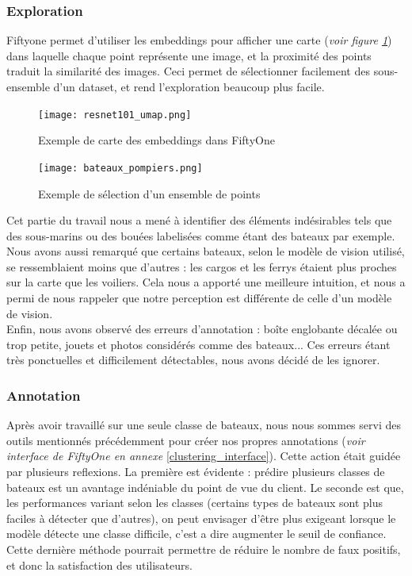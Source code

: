 \subsubsection{Exploration}

Fiftyone permet d'utiliser les embeddings pour afficher une carte (\textit{voir figure \ref{carte_similarite}})
    dans laquelle chaque point représente
une image, et la proximité des points traduit la similarité des images.
Ceci permet de sélectionner facilement des sous-ensemble d'un dataset, et rend l'exploration beaucoup
plus facile.

\begin{figure}[H]
    \centering
    \texttt{[image: resnet101\_umap.png]}
    \caption{Exemple de carte des embeddings dans FiftyOne}\label{carte_similarite}
\end{figure}

\begin{figure}[H]
    \centering
    \texttt{[image: bateaux\_pompiers.png]}
    \caption{Exemple de sélection d'un ensemble de points}
\end{figure}

Cet partie du travail nous a mené à identifier des éléments indésirables tels que des sous-marins ou
des bouées labelisées comme étant des bateaux par exemple. Nous avons aussi remarqué que certains bateaux,
selon le modèle de vision utilisé, se ressemblaient moins que d'autres : les cargos et les ferrys étaient
plus proches sur la carte que les voiliers. Cela nous a apporté une meilleure intuition, et nous a permi de nous rappeler que notre perception est différente de celle d'un modèle de vision.\\

Enfin, nous avons observé des erreurs d'annotation : boîte englobante décalée ou trop petite,
jouets et photos considérés comme des bateaux... Ces erreurs étant très ponctuelles et difficilement
détectables, nous avons décidé de les ignorer.\\

\subsubsection{Annotation}

Après avoir travaillé sur une seule classe de bateaux, nous nous sommes servi des outils mentionnés précédemment
pour créer nos propres annotations (\textit{voir interface de FiftyOne en annexe }\ref{clustering_interface}).
Cette action était guidée par plusieurs reflexions. La première est évidente :
prédire plusieurs classes de bateaux est un avantage indéniable du point de vue du client.
Le seconde est que, les performances variant selon les classes (certains types de bateaux sont plus faciles à
détecter que d'autres), on peut envisager d'être plus exigeant lorsque le modèle détecte une classe difficile,
c'est a dire augmenter le seuil de confiance. Cette dernière méthode pourrait permettre de réduire
le nombre de faux positifs, et donc la satisfaction des utilisateurs.\\

